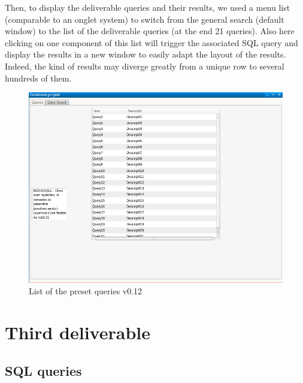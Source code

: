 \documentclass{article}
\begin{document}
Then, to display the deliverable queries and their results, we used a menu list (comparable to an onglet system) to switch from the general search (default window) to the list of the deliverable queries (at the end 21 queries). Also here clicking on one component of this list will trigger the associated SQL query and display the results in a new window to easily adapt the layout of the results. Indeed, the kind of results may diverge greatly from a unique row to several hundreds of them.
\begin{figure}[H]
        \includegraphics[width=\linewidth]{preset_list.png}
        \captionsetup{justification=centering}
        \caption{List of the preset queries v0.12}
    \end{figure}
\section{Third deliverable}

\subsection{SQL queries}
\end{document}
